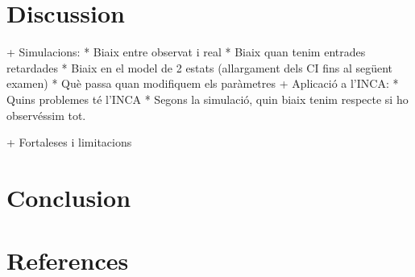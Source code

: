 \documentclass[10pt,a4paper]{article}
\begin{document}
\section{Discussion}
  + Simulacions:
    * Biaix entre observat i real
    * Biaix quan tenim entrades retardades
    * Biaix en el model de 2 estats (allargament dels CI fins al següent examen)
    * Què passa quan modifiquem els paràmetres
  + Aplicació a l'INCA:
    * Quins problemes té l'INCA
    * Segons la simulació, quin biaix tenim respecte si ho observéssim tot.

  + Fortaleses i limitacions

\section{Conclusion}

\section{References}
\end{document}
